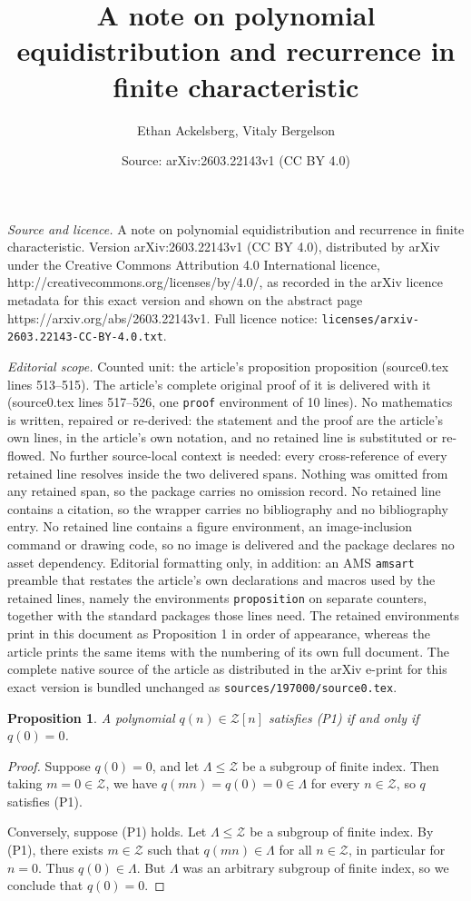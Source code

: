 \documentclass[10pt,a4paper]{amsart}
\title{A note on polynomial equidistribution and recurrence in finite characteristic}
\author{Ethan Ackelsberg, Vitaly Bergelson}
\date{Source: arXiv:2603.22143v1 (CC BY 4.0)}
\newtheorem{proposition}{Proposition}
\newcommand{\mZ}{\mathcal{Z}}
\begin{document}
\maketitle

\noindent\emph{Source and licence.} A note on polynomial equidistribution and recurrence in finite characteristic. Version arXiv:2603.22143v1 (CC BY 4.0), distributed by arXiv under the Creative Commons Attribution 4.0 International licence, http://creativecommons.org/licenses/by/4.0/, as recorded in the arXiv licence metadata for this exact version and shown on the abstract page https://arxiv.org/abs/2603.22143v1. Full licence notice: \texttt{licenses/arxiv-2603.22143-CC-BY-4.0.txt}.\par\smallskip

\noindent\textit{Editorial scope.} Counted unit: the article's proposition proposition (source0.tex lines 513--515). The article's complete original proof of it is delivered with it (source0.tex lines 517--526, one \texttt{proof} environment of 10 lines). No mathematics is written, repaired or re-derived: the statement and the proof are the article's own lines, in the article's own notation, and no retained line is substituted or re-flowed.  No further source-local context is needed: every cross-reference of every retained line resolves inside the two delivered spans.  Nothing was omitted from any retained span, so the package carries no omission record.  No retained line contains a citation, so the wrapper carries no bibliography and no bibliography entry.  No retained line contains a figure environment, an image-inclusion command or drawing code, so no image is delivered and the package declares no asset dependency.  Editorial formatting only, in addition: an AMS \texttt{amsart} preamble that restates the article's own declarations and macros used by the retained lines, namely the environments \texttt{proposition} on separate counters, together with the standard packages those lines need.  The retained environments print in this document as Proposition 1 in order of appearance, whereas the article prints the same items with the numbering of its own full document.  The complete native source of the article as distributed in the arXiv e-print for this exact version is bundled unchanged as \texttt{sources/197000/source0.tex}.
\begin{proposition}
    A polynomial $q(n) \in \mZ[n]$ satisfies (P1) if and only if $q(0) = 0$.
\end{proposition}

\begin{proof}
    Suppose $q(0) = 0$, and let $\Lambda \le \mZ$ be a subgroup of finite index.
    Then taking $m = 0 \in \mZ$, we have $q(mn) = q(0) = 0 \in \Lambda$ for every $n \in \mZ$, so $q$ satisfies (P1).

    Conversely, suppose (P1) holds.
    Let $\Lambda \le \mZ$ be a subgroup of finite index.
    By (P1), there exists $m \in \mZ$ such that $q(mn) \in \Lambda$ for all $n \in \mZ$, in particular for $n = 0$.
    Thus $q(0) \in \Lambda$.
    But $\Lambda$ was an arbitrary subgroup of finite index, so we conclude that $q(0) = 0$.
\end{proof}
\end{document}
